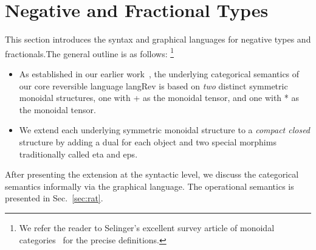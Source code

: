 \documentclass[preprint]{sigplanconf}
\newcommand{\xcomment}[2]{\textbf{#1:~\textsl{#2}}}
\newcommand{\roshan}[1]{\xcomment{Roshan}{#1}}
\newtheorem{proposition}[theorem]{Proposition}
\begin{document}



\section{Negative and Fractional Types}


This section introduces the syntax and graphical languages for
negative types and fractionals.The general outline is as follows:
\footnote{We refer the reader to Selinger's excellent survey
  article of monoidal
  categories~\cite{springerlink:10.1007/978-3-642-12821-94} for the precise
  definitions.}
\begin{itemize}
\item As established in our earlier work~\cite{rc2011,infeffects}, the
  underlying categorical semantics of our core reversible language
  {{langRev}} is based on \emph{two} distinct symmetric monoidal structures,
  one with {{+}} as the monoidal tensor, and one with {{*}} as the monoidal
  tensor.
\item We extend each underlying symmetric monoidal structure to a
  \emph{compact closed} structure by adding a dual for each object and two
  special morphims traditionally called {{eta}} and {{eps}}. 
\end{itemize}
After presenting the extension at the syntactic level, we discuss the
categorical semantics informally via the graphical language. The operational
semantics is presented in Sec.~\ref{sec:rat}. 
\end{document}

